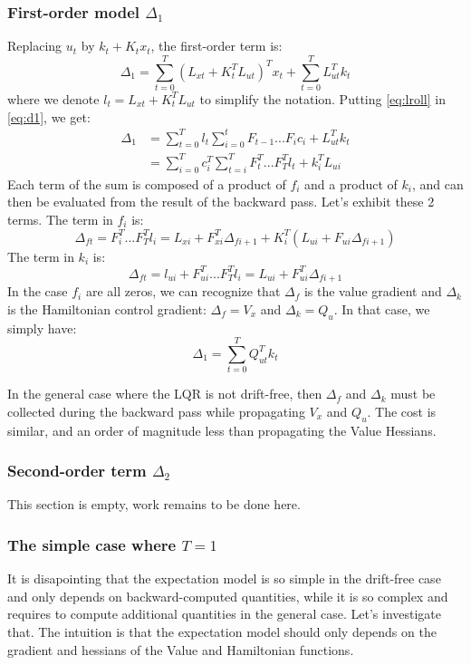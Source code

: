 \documentclass[10pt,a4paper]{article}
\begin{document}
\subsubsection{First-order model $\Delta_1$}
Replacing $u_t$ by $k_t + K_t x_t$, the first-order term is:
\begin{equation}
  \label{eq:d1}
  \Delta_1 = \sum_{t=0}^T (L_{xt} + K_t^T L_{ut}) ^T x_t + \sum_{t=0}^T L_{ut}^T k_t
\end{equation}
where we denote $l_t = L_{xt} + K_t^T L_{ut}$ to simplify the notation.
Putting \eqref{eq:lroll} in \eqref{eq:d1}, we get:
\begin{align}
  \Delta_1 &= \sum_{t=0}^{T} l_t \sum_{i=0}^{t} F_{t-1} ... F_i c_i + L_{ut}^T k_t \\
  & =  \sum_{i=0}^{T} c_i^T  \sum_{t=i}^{T} F_t^T ... F_T^T l_t + k_i^T L_{ui}
\end{align}
Each term of the sum is composed of a product of $f_i$ and a product of $k_i$, and can then be evaluated from the result of the backward pass.
Let's exhibit these 2 terms.
The term in $f_i$ is:
$$\Delta_{ft} = F_i^T ... F_T^T l_i = L_{xi} + F_{xi}^T \Delta_{fi+1} + K_i^T (L_{ui} + F_{ui} \Delta_{fi+1})$$
The term in $k_i$ is:
$$\Delta_{ft} = l_{ui} + F_{ui}^T ... F_T^T l_i = L_{ui} + F_{ui}^T \Delta_{fi+1}$$
In the case $f_i$ are all zeros, we can recognize that $\Delta_f$ is the value gradient and $\Delta_k$ is the Hamiltonian control gradient:
$\Delta_f = V_x$ and $\Delta_k = Q_u$.
In that case, we simply have:
$$\Delta_1 = \sum_{t=0}^{T} Q_{ut}^T k_t$$

In the general case where the LQR is not drift-free, then $\Delta_f$ and $\Delta_k$ must be collected during the backward pass while propagating $V_x$ and $Q_u$.
The cost is similar, and an order of magnitude less than propagating the Value Hessians.

\subsubsection{Second-order term $\Delta_2$}

This section is empty, work remains to be done here.

\subsubsection{The simple case where $T=1$}
It is disapointing that the expectation model is so simple in the drift-free case and only depends on backward-computed quantities, while it is so complex and requires to compute additional quantities in the general case.
Let's investigate that.
The intuition is that the expectation model should only depends on the gradient and hessians of the Value and Hamiltonian functions.
\end{document}
